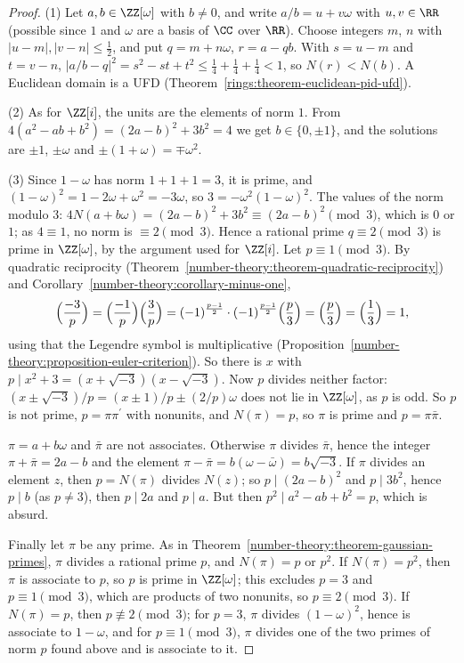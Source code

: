 \begin{proof}
(1) Let $a, b \in \ZZ[\omega]$ with $b \neq 0$, and write $a/b = u + v\omega$ with $u, v \in \RR$ (possible since $1$ and $\omega$ are a basis of $\CC$ over $\RR$). Choose integers $m$, $n$ with
$|u - m|, |v - n| \leq \frac12$, and put $q = m + n\omega$, $r = a - qb$. With $s = u - m$ and $t = v - n$, $|a/b - q|^2 = s^2 - st + t^2 \leq \frac14 + \frac14 + \frac14 < 1$, so $N(r) < N(b)$. A Euclidean
domain is a UFD (Theorem~\ref{rings:theorem-euclidean-pid-ufd}).

(2) As for $\ZZ[i]$, the units are the elements of norm $1$. From $4(a^2 - ab + b^2) = (2a - b)^2 + 3b^2 = 4$ we get $b \in \{0, \pm1\}$, and the solutions are $\pm1$, $\pm\omega$ and $\pm(1 + \omega) = \mp\omega^2$.

(3) Since $1 - \omega$ has norm $1 + 1 + 1 = 3$, it is prime, and $(1 - \omega)^2 = 1 - 2\omega + \omega^2 = -3\omega$, so $3 = -\omega^2(1 - \omega)^2$. The values of the norm modulo $3$:
$4N(a + b\omega) = (2a - b)^2 + 3b^2 \equiv (2a - b)^2 \pmod 3$, which is $0$ or $1$; as $4 \equiv 1$, no norm is $\equiv 2 \pmod 3$. Hence a rational prime $q \equiv 2 \pmod 3$ is prime in $\ZZ[\omega]$, by the
argument used for $\ZZ[i]$. Let $p \equiv 1 \pmod 3$. By quadratic reciprocity (Theorem~\ref{number-theory:theorem-quadratic-reciprocity}) and Corollary~\ref{number-theory:corollary-minus-one},
\[
\Bigl(\frac{-3}{p}\Bigr) = \Bigl(\frac{-1}{p}\Bigr)\Bigl(\frac{3}{p}\Bigr) = (-1)^{\frac{p-1}{2}}\cdot(-1)^{\frac{p-1}{2}}\Bigl(\frac{p}{3}\Bigr) = \Bigl(\frac{p}{3}\Bigr) = \Bigl(\frac{1}{3}\Bigr) = 1,
\]
using that the Legendre symbol is multiplicative (Proposition~\ref{number-theory:proposition-euler-criterion}). So there is $x$ with $p \mid x^2 + 3 = (x + \sqrt{-3})(x - \sqrt{-3})$. Now $p$ divides
neither factor: $(x \pm \sqrt{-3})/p = (x \pm 1)/p \pm (2/p)\omega$ does not lie in $\ZZ[\omega]$, as $p$ is odd. So $p$ is not prime, $p = \pi\pi^{\prime}$ with nonunits, and $N(\pi) = p$, so $\pi$ is prime
and $p = \pi\bar\pi$.

$\pi = a + b\omega$ and $\bar\pi$ are not associates. Otherwise $\pi$ divides $\bar\pi$, hence the integer $\pi + \bar\pi = 2a - b$ and the element $\pi - \bar\pi = b(\omega - \bar\omega) = b\sqrt{-3}$. If $\pi$
divides an element $z$, then $p = N(\pi)$ divides $N(z)$; so $p \mid (2a - b)^2$ and $p \mid 3b^2$, hence $p \mid b$ (as $p \neq 3$), then $p \mid 2a$ and $p \mid a$. But then $p^2 \mid a^2 - ab + b^2 = p$,
which is absurd.

Finally let $\pi$ be any prime. As in Theorem~\ref{number-theory:theorem-gaussian-primes}, $\pi$ divides a rational prime $p$, and $N(\pi) = p$ or $p^2$. If $N(\pi) = p^2$, then $\pi$ is associate to $p$, so $p$
is prime in $\ZZ[\omega]$; this excludes $p = 3$ and $p \equiv 1 \pmod 3$, which are products of two nonunits, so $p \equiv 2 \pmod 3$. If $N(\pi) = p$, then $p \not\equiv 2 \pmod 3$; for $p = 3$, $\pi$
divides $(1 - \omega)^2$, hence is associate to $1 - \omega$, and for $p \equiv 1 \pmod 3$, $\pi$ divides one of the two primes of norm $p$ found above and is associate to it.
\end{proof}

